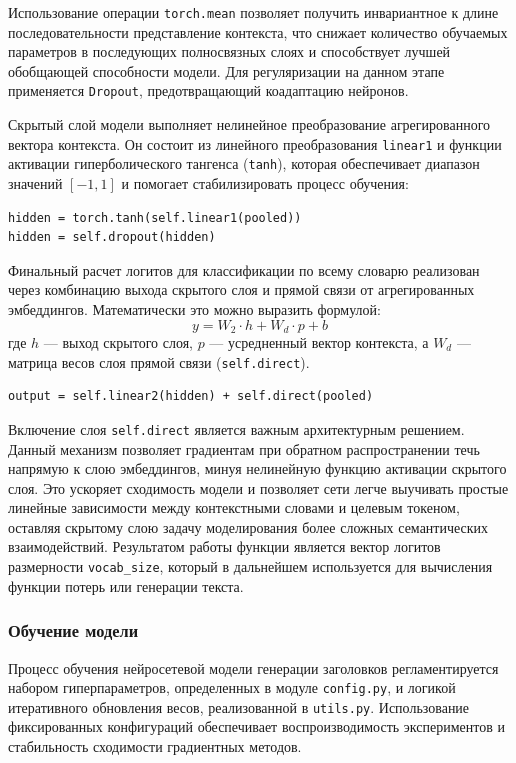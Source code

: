 \documentclass[coursework]{SCWorks}
\begin{document}
    Использование операции \texttt{torch.mean} позволяет получить инвариантное к длине последовательности представление контекста, что снижает количество обучаемых параметров в последующих полносвязных слоях и способствует лучшей обобщающей способности модели. Для регуляризации на данном этапе применяется \texttt{Dropout}, предотвращающий коадаптацию нейронов.

    Скрытый слой модели выполняет нелинейное преобразование агрегированного вектора контекста. Он состоит из линейного преобразования \texttt{linear1} и функции активации гиперболического тангенса (\texttt{tanh}), которая обеспечивает диапазон значений $[-1, 1]$ и помогает стабилизировать процесс обучения:

    \begin{verbatim}
hidden = torch.tanh(self.linear1(pooled))
hidden = self.dropout(hidden)
    \end{verbatim}

    Финальный расчет логитов для классификации по всему словарю реализован через комбинацию выхода скрытого слоя и прямой связи от агрегированных эмбеддингов. Математически это можно выразить формулой:
    \[ y = W_2 \cdot h + W_d \cdot p + b \]
    где $h$ — выход скрытого слоя, $p$ — усредненный вектор контекста, а $W_d$ — матрица весов слоя прямой связи (\texttt{self.direct}).

    \begin{verbatim}
output = self.linear2(hidden) + self.direct(pooled)
    \end{verbatim}

    Включение слоя \texttt{self.direct} является важным архитектурным решением. Данный механизм позволяет градиентам при обратном распространении течь напрямую к слою эмбеддингов, минуя нелинейную функцию активации скрытого слоя. Это ускоряет сходимость модели и позволяет сети легче выучивать простые линейные зависимости между контекстными словами и целевым токеном, оставляя скрытому слою задачу моделирования более сложных семантических взаимодействий. Результатом работы функции является вектор логитов размерности \texttt{vocab\_size}, который в дальнейшем используется для вычисления функции потерь или генерации текста.

    \subsubsection{Обучение модели}

    Процесс обучения нейросетевой модели генерации заголовков регламентируется набором гиперпараметров, определенных в модуле \texttt{config.py}, и логикой итеративного обновления весов, реализованной в \texttt{utils.py}. Использование фиксированных конфигураций обеспечивает воспроизводимость экспериментов и стабильность сходимости градиентных методов.
\end{document}
